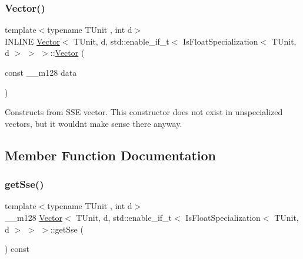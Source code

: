 \subsubsection{\texorpdfstring{Vector()}{Vector()}}
{\footnotesize\ttfamily template$<$typename T\+Unit , int d$>$ \\
I\+N\+L\+I\+NE \hyperlink{classVector}{Vector}$<$ T\+Unit, d, std\+::enable\+\_\+if\+\_\+t$<$ Is\+Float\+Specialization$<$ T\+Unit, d $>$ $>$ $>$\+::\hyperlink{classVector}{Vector} (\begin{DoxyParamCaption}\item[{const \+\_\+\+\_\+m128}]{data }\end{DoxyParamCaption})\hspace{0.3cm}{\ttfamily [inline]}}

Constructs from S\+SE vector. This constructor does not exist in unspecialized vectors, but it wouldn\textquotesingle{}t make sense there anyway. 

\subsection{Member Function Documentation}
\hypertarget{classVector_3_01TUnit_00_01d_00_01std_1_1enable__if__t_3_01IsFloatSpecialization_3_01TUnit_00_01d_01_4_01_4_01_4_a0456bf4470c681e6809c194df86b6045}{}\label{classVector_3_01TUnit_00_01d_00_01std_1_1enable__if__t_3_01IsFloatSpecialization_3_01TUnit_00_01d_01_4_01_4_01_4_a0456bf4470c681e6809c194df86b6045} 
\subsubsection{\texorpdfstring{get\+Sse()}{getSse()}}
{\footnotesize\ttfamily template$<$typename T\+Unit , int d$>$ \\
\+\_\+\+\_\+m128 \hyperlink{classVector}{Vector}$<$ T\+Unit, d, std\+::enable\+\_\+if\+\_\+t$<$ Is\+Float\+Specialization$<$ T\+Unit, d $>$ $>$ $>$\+::get\+Sse (\begin{DoxyParamCaption}{ }\end{DoxyParamCaption}) const\hspace{0.3cm}{\ttfamily [inline]}}

